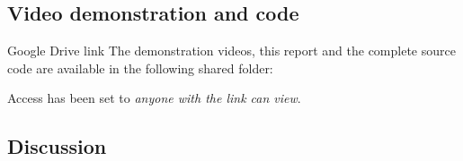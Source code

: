 \documentclass[10pt,a4paper]{article}
\begin{document}
\subsection*{Video demonstration and code}

\begin{titledbox}[before skip=6pt]{Google Drive link}
\noindent The demonstration videos, this report and the complete source code are
available in the following shared folder:

\vspace{4pt}
\noindent\drivefolder

\vspace{4pt}
{\small\color{cmnt} Access has been set to \emph{anyone with the link can view}.}
\end{titledbox}

\subsection*{Discussion}
\label{sec:discussion}
\end{document}
